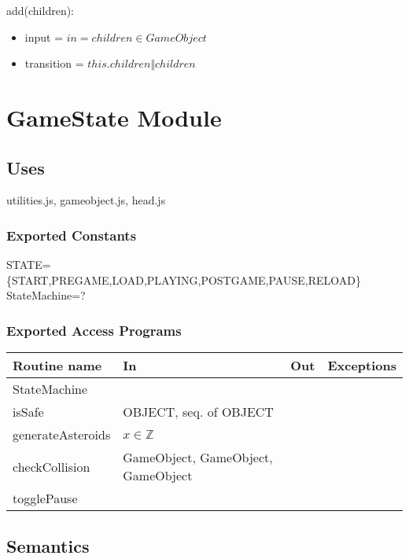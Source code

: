 \documentclass[12pt]{article}
\begin{document}
\noindent add(children):
\begin{itemize}
    \item input = $in = children \in GameObject$
    \item transition = $this.children \Vert children$
\end{itemize}



\newpage

\section*{GameState Module}

\subsection*{Uses}

utilities.js, gameobject.js, head.js\\

\subsubsection*{Exported Constants}

STATE=\{START,PREGAME,LOAD,PLAYING,POSTGAME,PAUSE,RELOAD\}\\
StateMachine=?\\

\subsubsection*{Exported Access Programs}

\begin{tabular}{| l | l | l | l |}
    \hline
    \textbf{Routine name} & \textbf{In} & \textbf{Out} & \textbf{Exceptions}\\
    \hline
    StateMachine &  & ~ & ~\\
    \hline
    isSafe & OBJECT, seq. of OBJECT & ~ & ~\\
    \hline
    generateAsteroids & $x \in \mathbb{Z}$ & ~ & ~ \\
    \hline
    checkCollision & GameObject, GameObject, GameObject & ~ & ~ \\
    \hline
    togglePause & ~ & ~ & ~ \\
    \hline
\end{tabular}

\subsection* {Semantics}
\end{document}
